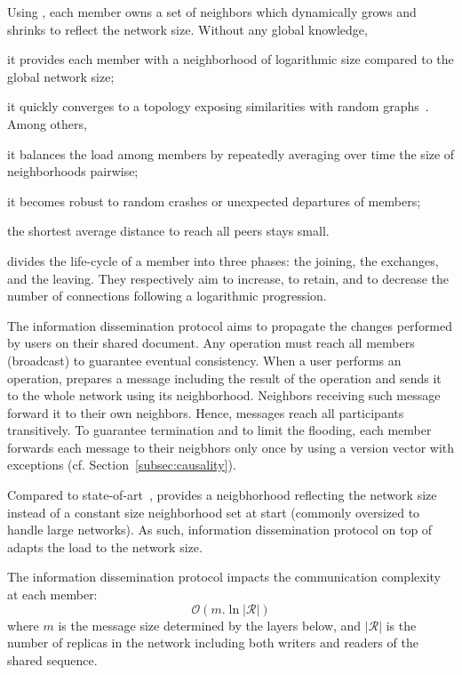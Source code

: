 \begin{asparadesc}
  Using \SPRAY, each member owns a set of neighbors which dynamically grows and
  shrinks to reflect the network size. Without any global knowledge,
  \begin{inparaenum}[(i)]
  \item it provides each member with a neighborhood of logarithmic size compared
    to the global network size;
  \item it quickly converges to a topology exposing similarities with random
    graphs~\cite{erdos1959random}. Among others,
    \begin{inparaenum}[(a)]
    \item it balances the load among members by repeatedly averaging over time the
      size of neighborhoods pairwise;
    \item it becomes robust to random crashes or unexpected departures of
      members;
    \item the shortest average distance to reach all peers stays small.
    \end{inparaenum}
  \end{inparaenum}
  
  \SPRAY divides the life-cycle of a member into three phases: the joining, the
  exchanges, and the leaving. They respectively aim to increase, to retain, and
  to decrease the number of connections following a logarithmic progression.

\item [The information dissemination protocol]\cite{birman1999bimodal} aims to
  propagate the changes performed by users on their shared document. Any
  operation must reach all members (broadcast) to guarantee eventual
  consistency.  When a user performs an operation, \CRATE prepares a message
  including the result of the operation and sends it to the whole network using
  its neighborhood. Neighbors receiving such message forward it to their own
  neighbors. Hence, messages reach all participants transitively. To guarantee
  termination and to limit the flooding, each member forwards each message to
  their neigbhors only once by using a version vector with exceptions
  (cf. Section~\ref{subsec:causality}).

  Compared to state-of-art~\cite{ganesh2003peer, jelasity2007gossip,
    voulgaris2005cyclon}, \SPRAY provides a neigbhorhood reflecting the network
  size instead of a constant size neighborhood set at start (commonly oversized
  to handle large networks). As such, information dissemination protocol on top
  of \SPRAY adapts the load to the network size.

  The information dissemination protocol impacts the communication complexity at
  each member:
  \begin{equation}
    \mathcal{O}(m.\ln |\mathcal{R}|)
  \end{equation}
  where $m$ is the message size determined by the layers below, and
  $|\mathcal{R}|$ is the number of replicas in the network including both
  writers and readers of the shared sequence.
\end{asparadesc}

